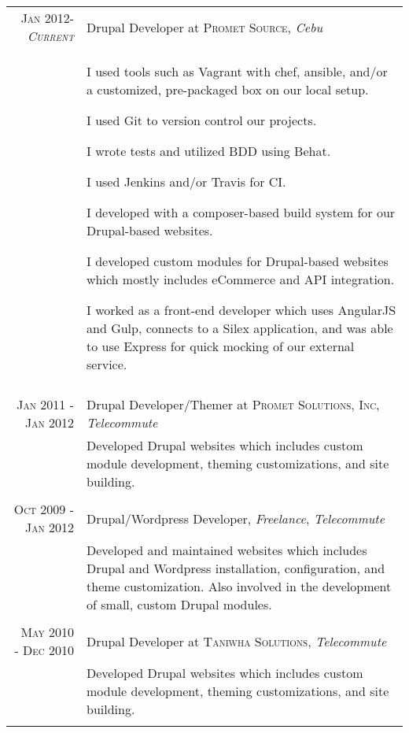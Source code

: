 \documentclass[a4paper,10pt]{article}
\begin{document}
\begin{tabular}{r|p{11cm}}
  \textsc{Jan 2012-\emph{Current}} & Drupal Developer at \textsc{Promet Source}, \emph{Cebu}\\ &
  \begin{blacklist}
    \item I used tools such as Vagrant with chef, ansible, and/or a customized, pre-packaged box on our local setup.
    \item I used Git to version control our projects.
    \item I wrote tests and utilized BDD using Behat.
    \item I used Jenkins and/or Travis for CI.
    \item I developed with a composer-based build system for our Drupal-based websites.
    \item I developed custom modules for Drupal-based websites which mostly includes eCommerce and API integration.
    \item I worked as a front-end developer which uses AngularJS and Gulp, connects to a Silex application, and was able to use Express for quick mocking of our external service.
  \end{blacklist}\\
  \multicolumn{2}{c}{}\\

  \textsc{Jan 2011 - Jan 2012} & Drupal Developer/Themer at \textsc{Promet Solutions, Inc}, \emph{Telecommute}\\
                             &\footnotesize{Developed Drupal websites which includes custom module development, theming customizations, and site building.}\\
  \multicolumn{2}{c}{}\\

  \textsc{Oct 2009 - Jan 2012} & Drupal/Wordpress Developer, \emph{Freelance}, \emph{Telecommute}\\
                             &\footnotesize{Developed and maintained websites which includes Drupal and Wordpress installation, configuration, and theme customization. Also involved in the development of small, custom Drupal modules.}\\
  \multicolumn{2}{c}{}\\

  \textsc{May 2010 - Dec 2010} & Drupal Developer at \textsc{Taniwha Solutions}, \emph{Telecommute}\\
                             &\footnotesize{Developed Drupal websites which includes custom module development, theming customizations, and site building.}\\
  \multicolumn{2}{c}{}\\


\end{tabular}
\end{document}
